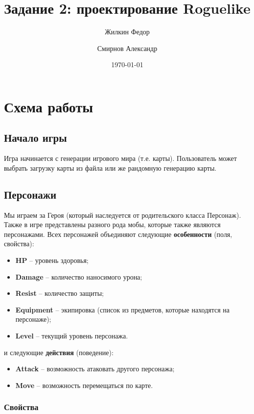 \documentclass[a4paper,10pt]{article}
\title{Задание 2: проектирование Roguelike}
\author{
	Жилкин Федор\\
	\and
	Смирнов Александр
}
\date{\today}
\begin{document}
\maketitle

\section*{Схема работы}

\subsection*{Начало игры}

Игра начинается с генерации игрового мира (т.е. карты). Пользователь может выбрать загрузку карты из файла или же рандомную генерацию карты. 

\subsection*{Персонажи}

Мы играем за Героя (который наследуется от родительского класса Персонаж). Также в игре представлены разного рода мобы, которые также являются персонажами. 
Всех персонажей объединяют следующие \textbf{особенности} (поля, свойства): 

\begin{itemize}
    \item \textbf{HP} -- уровень здоровья;
    \item \textbf{Damage} -- количество наносимого урона;
    \item \textbf{Resist} -- количество защиты;
    \item \textbf{Equipment} -- экипировка (список из предметов, которые находятся на персонаже);
    \item \textbf{Level} -- текущий уровень персонажа.
\end{itemize}


и следующие \textbf{действия} (поведение):


\begin{itemize}
    \item \textbf{Attack} -- возможность атаковать другого персонажа;
    \item \textbf{Move} -- возможность перемещаться по карте.
\end{itemize}

\subsubsection*{Свойства}
\end{document}
